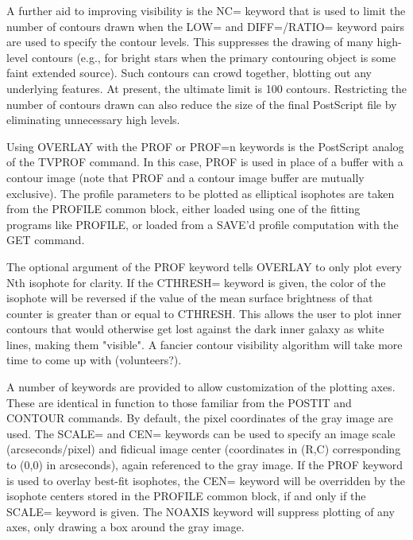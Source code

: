 A further aid to improving visibility is the NC= keyword that is used to
limit the number of contours drawn when the LOW= and DIFF=/RATIO= keyword
pairs are used to specify the contour levels.  This suppresses the drawing
of many high-level contours (e.g., for bright stars when the primary
contouring object is some faint extended source).  Such contours can crowd
together, blotting out any underlying features.  At present, the ultimate
limit is 100 contours.  Restricting the number of contours drawn can also
reduce the size of the final PostScript file by eliminating unnecessary
high levels.


Using OVERLAY with the PROF or PROF=n keywords is the PostScript analog of
the TVPROF command.  In this case, PROF is used in place of a buffer with a
contour image (note that PROF and a contour image buffer are mutually
exclusive).  The profile parameters to be plotted as elliptical isophotes
are taken from the PROFILE common block, either loaded using one of the
fitting programs like PROFILE, or loaded from a SAVE'd profile computation
with the GET command.

The optional argument of the PROF keyword tells OVERLAY to only plot every
Nth isophote for clarity.  If the CTHRESH= keyword is given, the color of
the isophote will be reversed if the value of the mean surface brightness
of that counter is greater than or equal to CTHRESH.  This allows the user
to plot inner contours that would otherwise get lost against the dark inner
galaxy as white lines, making them "visible".  A fancier contour visibility
algorithm will take more time to come up with (volunteers?).



A number of keywords are provided to allow customization of the plotting
axes.  These are identical in function to those familiar from the POSTIT
and CONTOUR commands.  By default, the pixel coordinates of the gray image
are used.  The SCALE= and CEN= keywords can be used to specify an image
scale (arcseconds/pixel) and fidicual image center (coordinates in (R,C)
corresponding to (0,0) in arcseconds), again referenced to the gray image.
If the PROF keyword is used to overlay best-fit isophotes, the CEN= keyword
will be overridden by the isophote centers stored in the PROFILE common
block, if and only if the SCALE= keyword is given.  The NOAXIS keyword will
suppress plotting of any axes, only drawing a box around the gray image.

